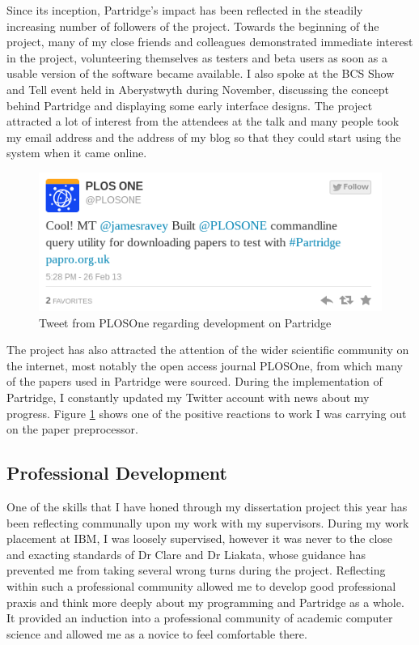 Since its inception, Partridge's impact has been reflected in the steadily
increasing number of followers of the project. Towards the beginning of the
project, many of my close friends and colleagues demonstrated immediate
interest in the project, volunteering themselves as testers and beta users as
soon as a usable version of the software became available. I also spoke at the
BCS Show and Tell event held in Aberystwyth during November, discussing the
concept behind Partridge and displaying some early interface designs. The
project attracted a lot of interest from the attendees at the talk and many
people took my email address and the address of my blog so that they could
start using the system when it came online.

\begin{figure}[!h]
\centering
\includegraphics[width=\textwidth]{images/evaluation/plostweet.png}
\caption{Tweet from PLOSOne regarding development on Partridge}
\label{fig:plostweet}
\end{figure}

The project has also attracted the attention of the wider scientific community
on the internet, most notably the open access journal PLOSOne, from which many
of the papers used in Partridge were sourced. During the implementation of
Partridge, I constantly updated my Twitter account with news about my
progress. Figure \ref{fig:plostweet} shows one of the positive reactions to
work I was carrying out on the paper preprocessor.

\subsection{Professional Development}

One of the skills that I have honed through my dissertation project this year
has been reflecting communally upon my work with my supervisors. During my work
placement at IBM, I was loosely supervised, however it was never to the close
and exacting standards of Dr Clare and Dr Liakata, whose guidance has 
prevented me from taking several wrong turns during the project. Reflecting
within such a professional community allowed me to develop good professional
praxis and think more deeply about my programming and Partridge as a whole. It
provided an induction into a professional community of academic computer
science and allowed me as a novice to feel comfortable there. 

